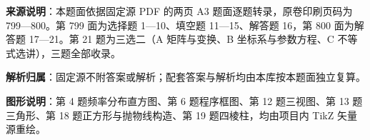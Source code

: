 

\begin{gknotice}
\textbf{来源说明}：本题面依据固定源 PDF 的两页 A3 题面逐题转录，原卷印刷页码为 799—800。第 799 面为选择题 1—10、填空题 11—15、解答题 16，第 800 面为解答题 17—21。第 21 题为三选二（A 矩阵与变换、B 坐标系与参数方程、C 不等式选讲），三题全部收录。

\textbf{解析归属}：固定源不附答案或解析；配套答案与解析均由本库按本题面独立复算。

\textbf{图形说明}：第 4 题频率分布直方图、第 6 题程序框图、第 12 题三视图、第 13 题三角形、第 18 题正方形与抛物线构造、第 19 题四棱柱，均由项目内 TikZ 矢量源重绘。
\end{gknotice}


